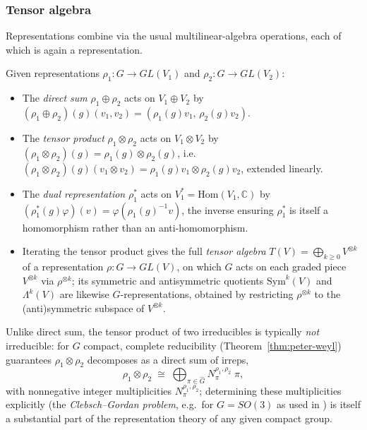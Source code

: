 \documentclass[mathematics,review,submit,moreauthors]{Definitions/mdpi}
\begin{document}
\subsubsection{Tensor algebra}
\label{subsubsec:tensor-algebra}

Representations combine via the usual multilinear-algebra operations, each
of which is again a representation.

\begin{Definition}
\label{def:tensor-operations}
Given representations $\rho_1 : G \to GL(V_1)$ and $\rho_2 : G \to GL(V_2)$:
\begin{itemize}
    \item The \emph{direct sum} $\rho_1 \oplus \rho_2$ acts on
    $V_1 \oplus V_2$ by $(\rho_1 \oplus \rho_2)(g)(v_1,v_2) =
    (\rho_1(g)v_1,\, \rho_2(g)v_2)$.
    \item The \emph{tensor product} $\rho_1 \otimes \rho_2$ acts on
    $V_1 \otimes V_2$ by
    $(\rho_1 \otimes \rho_2)(g) = \rho_1(g) \otimes \rho_2(g)$, i.e.\
    $(\rho_1\otimes\rho_2)(g)(v_1 \otimes v_2) = \rho_1(g)v_1 \otimes \rho_2(g)v_2$,
    extended linearly.
    \item The \emph{dual representation} $\rho_1^*$ acts on
    $V_1^* = \mathrm{Hom}(V_1,\mathbb{C})$ by
    $(\rho_1^*(g)\varphi)(v) = \varphi(\rho_1(g)^{-1} v)$, the inverse
    ensuring $\rho_1^*$ is itself a homomorphism rather than an
    anti-homomorphism.
    \item Iterating the tensor product gives the full \emph{tensor algebra}
    $T(V) = \bigoplus_{k \geq 0} V^{\otimes k}$ of a representation
    $\rho: G \to GL(V)$, on which $G$ acts on each graded piece
    $V^{\otimes k}$ via $\rho^{\otimes k}$; its symmetric and antisymmetric
    quotients $\mathrm{Sym}^k(V)$ and $\Lambda^k(V)$ are likewise
    $G$-representations, obtained by restricting $\rho^{\otimes k}$ to the
    (anti)symmetric subspace of $V^{\otimes k}$.
\end{itemize}
\end{Definition}

Unlike direct sum, the tensor product of two irreducibles is typically
\emph{not} irreducible: for $G$ compact, complete reducibility
(Theorem~\ref{thm:peter-weyl}) guarantees $\rho_1 \otimes \rho_2$ decomposes
as a direct sum of irreps,
\[
    \rho_1 \otimes \rho_2 \;\cong\; \bigoplus_{\pi \in \widehat{G}} N_{\pi}^{\rho_1,\rho_2}\; \pi,
\]
with nonnegative integer multiplicities $N_\pi^{\rho_1,\rho_2}$; determining
these multiplicities explicitly (the \emph{Clebsch--Gordan problem}, e.g.\
for $G = SO(3)$ as used in \cite{kondor2018p3icml}) is itself a substantial
part of the representation theory of any given compact group.
\end{document}
